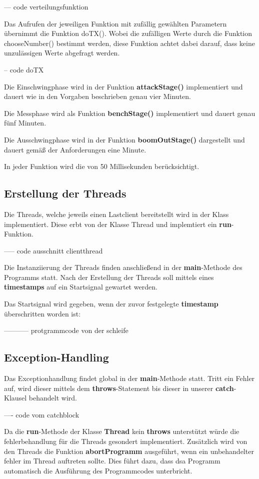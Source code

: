 --- code verteilungsfunktion

Das Aufrufen der jeweiligen Funktion mit zufällig gewählten Parametern übernimmt die Funktion
doTX(). Wobei die zufälligen Werte durch die Funktion chooseNumber() bestimmt
werden, diese Funktion achtet dabei darauf, dass keine unzulässigen Werte
abgefragt werden.


-- code doTX

Die Einschwingphase wird in der Funktion \textbf{attackStage()} implementiert
und dauert wie in den Vorgaben beschrieben genau vier Minuten.

Die Messphase wird als Funktion \textbf{benchStage()} implementiert und dauert
genau fünf Minuten.

Die Ausschwingphase wird in der Funktion \textbf{boomOutStage()} dargestellt und
dauert gemäß der Anforderungen eine Minute.

In jeder Funktion wird die  von 50 Millisekunden berücksichtigt.

\subsection{Erstellung der Threads}

Die Threads, welche jeweils einen Lastclient bereitstellt wird in der Klass
 implementiert. Diese erbt von der Klasse Thread und
implemtiert ein \textbf{run}-Funktion.

----- code ausschnitt clientthread

Die Instanziierung der Threads finden anschließend in der
\textbf{main}-Methode des Programms statt. Nach der Erstellung der Threads
soll mittels eines \textbf{timestamps} auf ein Startsignal gewartet werden.

Das Startsignal wird gegeben, wenn der zuvor festgelegte \textbf{timestamp}
überschritten worden ist:

----------- protgrammcode von der schleife


\subsection{Exception-Handling}

Das Exceptionhandlung findet global in der \textbf{main}-Methode statt. Tritt
ein Fehler auf, wird dieser mittels dem \textbf{throws}-Statement
 bis dieser in unserer \textbf{catch}-Klausel behandelt wird.

---- code vom catchblock

Da die \textbf{run}-Methode der Klasse \textbf{Thread} kein \textbf{throws}
unterstützt würde die fehlerbehandlung für die Threads gesondert implementiert.
Zusätzlich wird von den Threads die Funktion \textbf{abortProgramm}
ausgeführt, wenn ein unbehandelter fehler im Thread auftreten sollte. Dies führt
dazu, dass dsa Programm automatisch die Ausführung des Programmcodes
unterbricht.

\clearpage